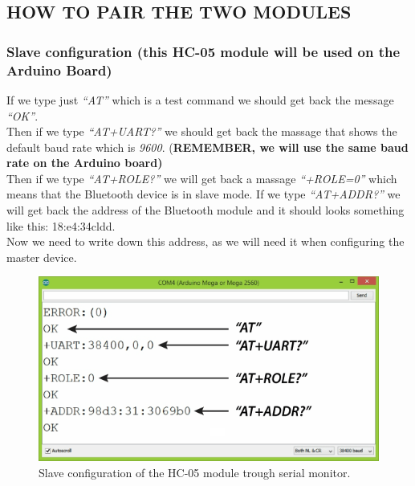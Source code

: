 \subsection{HOW TO PAIR THE TWO MODULES}

\subsubsection{Slave configuration (this HC-05 module will be used on the Arduino Board)}
If we type just \textit{“AT”} which is a test command we should get back the message \textit{“OK”}.\\
Then if we type \textit{“AT+UART?”} we should get back the massage that shows the default baud rate which is \textit{9600}. (\textbf{REMEMBER, we will use the same baud rate on the Arduino board)}\\
Then if we type \textit{“AT+ROLE?”} we will get back a massage \textit{“+ROLE=0”} which means that the Bluetooth device is in slave mode. If we type \textit{“AT+ADDR?”} we will get back the address of the Bluetooth module and it should looks something like this: 18:e4:34cldd. \\
Now we need to write down this address, as we will need it when configuring the master device.
\begin{figure}[H]
	\centering
	\includegraphics[width=\textwidth]
	{files/images/hc05_slave2}
	\caption{Slave configuration of the HC-05 module trough serial monitor.}
\end{figure}

